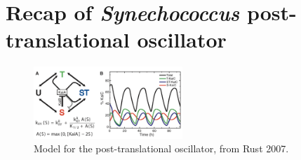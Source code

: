 \documentclass{article}
\begin{document}
\large

\section*{Recap of \textit{Synechococcus} post-translational oscillator}

\begin{figure}
\begin{center}
\includegraphics[width=0.5\textwidth]{pto.png}
\caption{Model for the post-translational oscillator, from Rust 2007.}
\end{center}
\end{figure}
\end{document}
